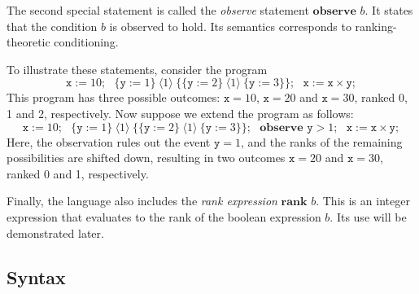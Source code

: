 \documentclass{llncs}
\newcommand{\Rank}[1]{\hspace{3pt} \pmb{\langle} #1 \pmb{\rangle}\hspace{3pt} } %
\begin{document}
The second special statement is called the \emph{observe} statement
	$\textbf{observe }b.$
It states that the condition $b$ is observed to hold.
Its semantics corresponds to ranking-theoretic conditioning.

To illustrate these statements, consider the program
	$$\texttt{x} := 10;\mbox{ } \{ \texttt{y} := 1 \} \Rank{1} \{ \{\texttt{y} := 2\} \Rank{1} \{\texttt{y} := 3\} \};\mbox{ } \texttt{x} := \texttt{x} \times \texttt{y};$$
This program has three possible outcomes: $\texttt{x} = 10$, $\texttt{x} = 20$ and $\texttt{x} = 30$, ranked 0, 1 and 2, respectively.
Now suppose we extend the program as follows: 
	$$\texttt{x} := 10;\mbox{ } \{ \texttt{y} := 1 \} \Rank{1} \{ \{\texttt{y} := 2\} \Rank{1} \{\texttt{y} := 3\} \};\mbox{ } \textbf{observe } \texttt{y} > 1;\mbox{ } \texttt{x} := \texttt{x} \times \texttt{y};$$
Here, the observation rules out the event $\texttt{y} = 1$,
	and the ranks of the remaining possibilities are shifted down, 
	resulting in two outcomes $\texttt{x} = 20$ and $\texttt{x} = 30$, ranked 0 and 1, respectively.

Finally, the language also includes the \emph{rank expression} $\textbf{rank }b.$
This is an integer expression that evaluates to the rank of the boolean expression $b$.
Its use will be demonstrated later.

\subsection{Syntax}
\end{document}
